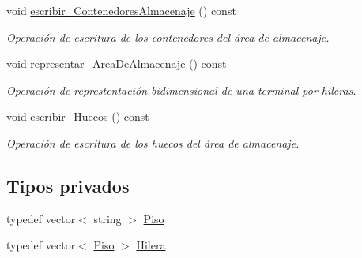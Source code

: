 \begin{DoxyCompactItemize}
void \hyperlink{class_terminal_a24c74e2dd8c8e41452a7e890bc925f0e}{escribir\+\_\+\+Contenedores\+Almacenaje} () const
\begin{DoxyCompactList}\small\item\em Operación de escritura de los contenedores del área de almacenaje. \end{DoxyCompactList}\item 
void \hyperlink{class_terminal_a32d375e8cecdafbbf0a291f646456dd6}{representar\+\_\+\+Area\+De\+Almacenaje} () const
\begin{DoxyCompactList}\small\item\em Operación de represtentación bidimensional de una terminal por hileras. \end{DoxyCompactList}\item 
void \hyperlink{class_terminal_afbfd7c045961e20718f9b5ffa1a31aa1}{escribir\+\_\+\+Huecos} () const
\begin{DoxyCompactList}\small\item\em Operación de escritura de los huecos del área de almacenaje. \end{DoxyCompactList}\end{DoxyCompactItemize}
\subsection*{Tipos privados}
\begin{DoxyCompactItemize}
\item 
typedef vector$<$ string $>$ \hyperlink{class_terminal_a06c48b71c1afa0f6cb9ec885fe53117c}{Piso}
\item 
typedef vector$<$ \hyperlink{class_terminal_a06c48b71c1afa0f6cb9ec885fe53117c}{Piso} $>$ \hyperlink{class_terminal_aba85ff115aaa21fc79271673ad4231b9}{Hilera}
\end{DoxyCompactItemize}
